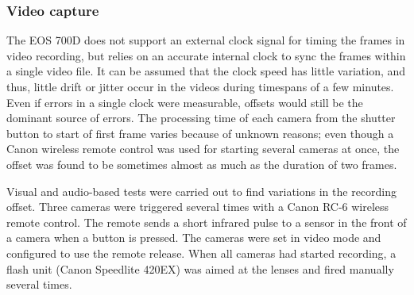 
\subsubsection{Video capture}


The EOS 700D does not support an external clock signal for timing the frames in video recording, but relies on an accurate internal clock to sync the frames within a single video file.
It can be assumed that the clock speed has little variation, and thus, little drift or jitter occur in the videos during timespans of a few minutes.
Even if errors in a single clock were measurable, offsets would still be the dominant source of errors.
The processing time of each camera from the shutter button to start of first frame varies because of unknown reasons; even though a Canon wireless remote control was used for starting several cameras at once, the offset was found to be sometimes almost as much as the duration of two frames.


Visual and audio-based tests were carried out to find variations in the recording offset.
Three cameras were triggered several times with a Canon RC-6 wireless remote control.
The remote sends a short infrared pulse to a sensor in the front of a camera when a button is pressed.
The cameras were set in video mode and configured to use the remote release.
When all cameras had started recording, a flash unit (Canon Speedlite 420EX) was aimed at the lenses and fired manually several times.


